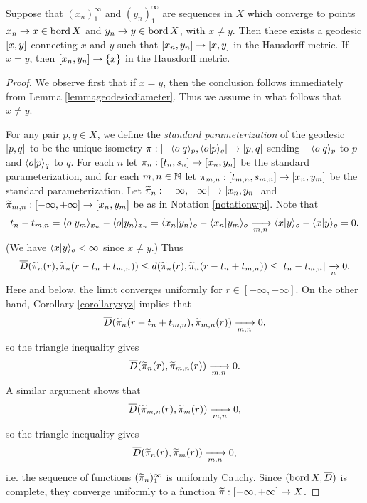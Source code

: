 \begin{lemma}
\label{lemmageodesicconvergence}
Suppose that $(x_n)_1^\infty$ and $(y_n)_1^\infty$ are sequences in $X$ which converge to points $x_n\to x\in\operatorname{bord} X$ and $y_n\to y\in\operatorname{bord} X$, with $x\neq y$. Then there exists a geodesic $[x,y]$ connecting $x$ and $y$ such that $[x_n,y_n] \to [x,y]$ in the Hausdorff metric. If $x = y$, then $[x_n,y_n]\to \{x\}$ in the Hausdorff metric.
\end{lemma}
\begin{proof}
We observe first that if $x = y$, then the conclusion follows immediately from Lemma \ref{lemmageodesicdiameter}. Thus we assume in what follows that $x\neq y$.

For any pair $p,q\in X$, we define the \emph{standard parameterization} of the geodesic $[p,q]$ to be the unique isometry $\pi:[-\langle o|q\rangle_p , \langle o|p\rangle_q] \to [p,q]$ sending $-\langle o|q\rangle_p$ to $p$ and $\langle o|p\rangle_q$ to $q$. For each $n$ let $\pi_n:[t_n,s_n]\to [x_n,y_n]$ be the standard parameterization, and for each $m,n\in\N$ let $\pi_{m,n}:[t_{m,n},s_{m,n}]\to [x_n,y_m]$ be the standard parameterization. Let $\widetilde\pi_n:[-\infty,+\infty]\to [x_n,y_n]$ and $\widetilde\pi_{m,n}:[-\infty,+\infty]\to [x_n,y_m]$ be as in Notation \ref{notationwpi}. Note that
\[
t_n - t_{m,n} = \langle o|y_m\rangle_{x_n} - \langle o|y_n\rangle_{x_n} = \langle x_n|y_n\rangle_o - \langle x_n|y_m\rangle_o \xrightarrow[m,n]{} \langle x|y\rangle_o - \langle x|y\rangle_o = 0.
\]
(We have $\langle x|y\rangle_o < \infty$ since $x\neq y$.) Thus
\[
\overline{D}(\widetilde\pi_n(r), \widetilde\pi_n(r - t_n + t_{m,n})) \leq d(\widetilde\pi_n(r), \widetilde\pi_n(r - t_n + t_{m,n})) \leq |t_n - t_{m,n}| \xrightarrow[n]{} 0.
\]
Here and below, the limit converges uniformly for $r\in[-\infty,+\infty]$. On the other hand, Corollary \ref{corollaryxyz} implies that
\[
\overline{D}(\widetilde\pi_n(r - t_n + t_{m,n}) , \widetilde\pi_{m,n}(r)) \xrightarrow[m,n]{} 0,
\]
so the triangle inequality gives
\[
\overline{D}(\widetilde\pi_n(r) , \widetilde\pi_{m,n}(r)) \xrightarrow[m,n]{} 0.
\]
A similar argument shows that
\[
\overline{D}(\widetilde\pi_{m,n}(r) , \widetilde\pi_m(r)) \xrightarrow[m,n]{} 0,
\]
so the triangle inequality gives
\[
\overline{D}(\widetilde\pi_n(r) , \widetilde\pi_m(r)) \xrightarrow[m,n]{} 0,
\]
i.e. the sequence of functions $(\widetilde\pi_n)_1^\infty$ is uniformly Cauchy. Since $(\operatorname{bord} X,\overline{D})$ is complete, they converge uniformly to a function $\widetilde\pi:[-\infty,+\infty]\to X$.


\end{proof}
